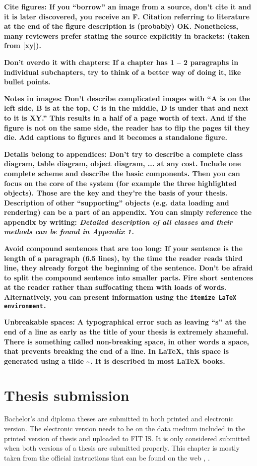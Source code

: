 {{\bf Cite figures: \rm If you ``borrow'' an image from a source, don't cite it and it is later discovered, you receive an F. Citation referring to literature at the end of the figure description is (probably) OK. Nonetheless, many reviewers prefer stating the source explicitly in brackets: (taken from [xy]).

\bf Don't overdo it with chapters: \rm If a chapter has 1 -- 2 paragraphs in individual subchapters, try to think of a better way of doing it, like bullet points.

\bf Notes in images: \rm Don't describe complicated images with ``A is on the left side, B is at the top, C is in the middle, D is under that and next to it is XY.'' This results in a half of a page worth of text. And if the figure is not on the same side, the reader has to flip the pages til they die. Add captions to figures and it becomes a standalone figure.

\bf Details belong to appendices: \rm Don't try to describe a complete class diagram, table diagram, object diagram, ... at any cost. Include one complete scheme and describe the basic components. Then you can focus on the core of the system (for example the three highlighted objects). Those are the key and they're the basis of your thesis. Description of other ``supporting'' objects (e.g. data loading and rendering) can be a part of an appendix. You can simply reference the appendix by writing: \it Detailed description of all classes and their methods can be found in Appendix 1. \rm

\bf Avoid compound sentences that are too long: \rm If your sentence is the length of a paragraph (6.5 lines), by the time the reader reads third line, they already forgot the beginning of the sentence. Don't be afraid to split the compound sentence into smaller parts. Fire short sentences at the reader rather than suffocating them with loads of words. Alternatively, you can present information using the \tt itemize \rm LaTeX environment.

\bf Unbreakable spaces: \rm A typographical error such as leaving ``s'' at the end of a line as early as the title of your thesis is extremely shameful. There is something called non-breaking space, in other words a space, that prevents breaking the end of a line. In LaTeX, this space is generated using a tilde \textasciitilde. It is described in most \LaTeX{} books.

\chapter{Thesis submission}
\label{odevzdani}
Bachelor's and diploma theses are submitted in both printed and electronic version. The electronic version needs to be on the data medium included in the printed version of thesis and uploaded to FIT IS. It is only considered submitted when both versions of a thesis are submitted properly. This chapter is mostly taken from the official instructions that can be found on the web \cite{formalniBP}, \cite{formalniDP}.

}}
